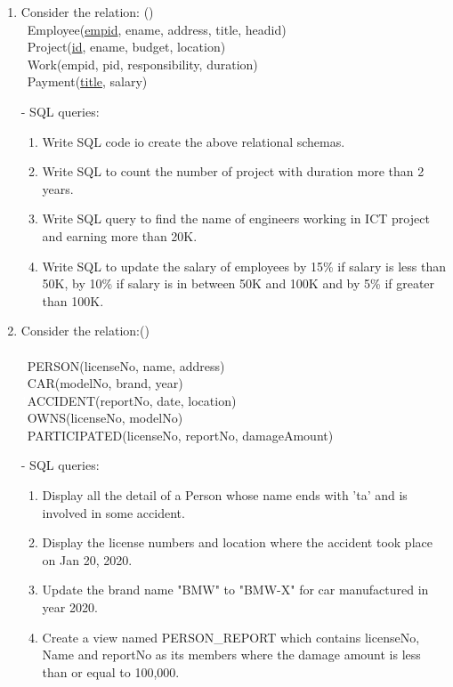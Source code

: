 \documentclass[12pt]{article}
\newcommand{\enter}{\\\textcolor{white}{1}}
\begin{document}
    \begin{enumerate}

    \item Consider the relation: \hfill()
        \enter Employee(\underline{empid}, ename, address, title, headid)
        \enter Project(\underline{id}, ename, budget, location)
        \enter Work(empid, pid, responsibility, duration)
        \enter Payment(\underline{title}, salary)

        - SQL queries:  
        \begin{enumerate}[noitemsep, topsep = 0pt, label = \alph*.]
            \item Write SQL code io create the above relational schemas.
            \item Write SQL to count the number of project with duration more than 2 years.
            \item Write SQL query to find the name of engineers working in ICT project and earning more than 20K.
            \item Write SQL to update the salary of employees by 15\% if salary is less than 50K, by 10\% if salary is in between 50K and 100K and by 5\% if greater than 100K.
        \end{enumerate}

    \item Consider the relation:\hfill()\\
        \enter PERSON(licenseNo, name, address)
        \enter CAR(modelNo, brand, year)
        \enter ACCIDENT(reportNo, date, location)
        \enter OWNS(licenseNo, modelNo)
        \enter PARTICIPATED(licenseNo, reportNo, damageAmount)
        
        - SQL queries: 
        \begin{enumerate}[noitemsep, topsep = 0pt, label = \alph*.]
            \item Display all the detail of a Person whose name ends with 'ta' and is involved in some accident.
            \item Display the license numbers and location where the accident took place on Jan 20, 2020.
            \item Update the brand name "BMW" to "BMW-X" for car manufactured in year 2020.
            \item Create a view named PERSON\_REPORT which contains licenseNo, Name and reportNo as its members where the damage amount is less than or equal to 100,000.
        \end{enumerate}


\end{enumerate}
\end{document}
